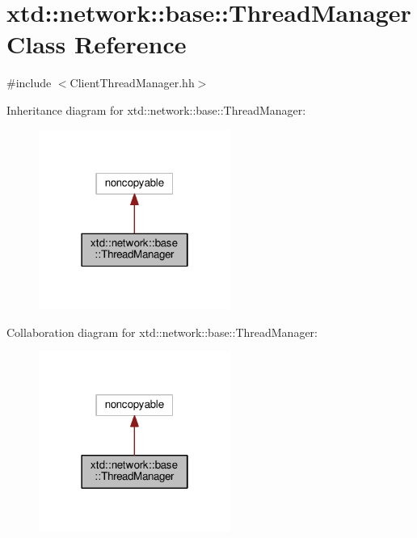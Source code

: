 \hypertarget{classxtd_1_1network_1_1base_1_1ThreadManager}{}\section{xtd\+:\+:network\+:\+:base\+:\+:Thread\+Manager Class Reference}
\label{classxtd_1_1network_1_1base_1_1ThreadManager}


{\ttfamily \#include $<$Client\+Thread\+Manager.\+hh$>$}



Inheritance diagram for xtd\+:\+:network\+:\+:base\+:\+:Thread\+Manager\+:
\nopagebreak
\begin{figure}[H]
\begin{center}
\leavevmode
\includegraphics[width=178pt]{classxtd_1_1network_1_1base_1_1ThreadManager__inherit__graph}
\end{center}
\end{figure}


Collaboration diagram for xtd\+:\+:network\+:\+:base\+:\+:Thread\+Manager\+:
\nopagebreak
\begin{figure}[H]
\begin{center}
\leavevmode
\includegraphics[width=178pt]{classxtd_1_1network_1_1base_1_1ThreadManager__coll__graph}
\end{center}
\end{figure}
